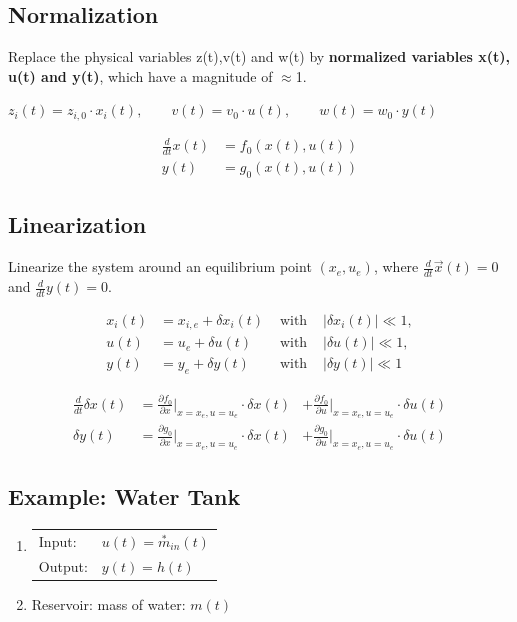 \documentclass[10pt,a4paper]{scrartcl}
\begin{document}
\begin{multicols*}{3}
\subsection{Normalization}
	Replace the physical variables z(t),v(t) and w(t) by \textbf{normalized variables x(t), u(t) and y(t)}, which have a magnitude of $\approx$1.
	
	$z_i(t)=z_{i,0}\cdot x_i(t),\qquad v(t)=v_0\cdot u(t),\qquad w(t)=w_0\cdot y(t)$
	
	\begin{align*}
	\frac{d}{dt}x(t)&=f_0(x(t),u(t))\\
	y(t)&=g_0(x(t),u(t))
	\end{align*}
	
\vfill
\null
\columnbreak

\subsection{Linearization}
	
Linearize the system around an equilibrium point $(x_e,u_e)$, where $\frac{d}{dt}\vec{x}(t)=0$ and $\frac{d}{dt}y(t)=0$.
	
\begin{alignat*}{4}
x_i(t)&=x_{i,e}+\delta x_i(t)&\text{ with  }&|\delta x_i(t)|\ll 1,\\
u(t)&=u_e+\delta u(t)&\text{ with  }&|\delta u(t)|\ll 1,\\
y(t)&=y_e+\delta y(t)&\text{ with  } &|\delta y(t)|\ll 1
\end{alignat*}
	
\begin{alignat*}{3}
\frac{d}{dt}\delta x(t) &= \frac{\partial f_0}{\partial x}|_{x=x_e,u=u_e}\cdot \delta x(t)&+\frac{\partial f_0}{\partial u}|_{x=x_e,u=u_e}\cdot \delta u(t)\\
\delta y(t)&=\frac{\partial g_0}{\partial x}|_{x=x_e,u=u_e}\cdot\delta x(t) &+\frac{\partial g_0}{\partial u}|_{x=x_e,u=u_e}\cdot\delta u(t)
\end{alignat*}
	
	
\subsection{Example: Water Tank}


\begin{enumerate}
\item \begin{tabular}{ll}Input:&$u(t)=\overset{\ast}{m}_{in}(t)$\\Output:&$y(t)=h(t)$\end{tabular}
\item Reservoir: mass of water: $m(t)$


\end{enumerate}
\end{multicols*}
\end{document}
